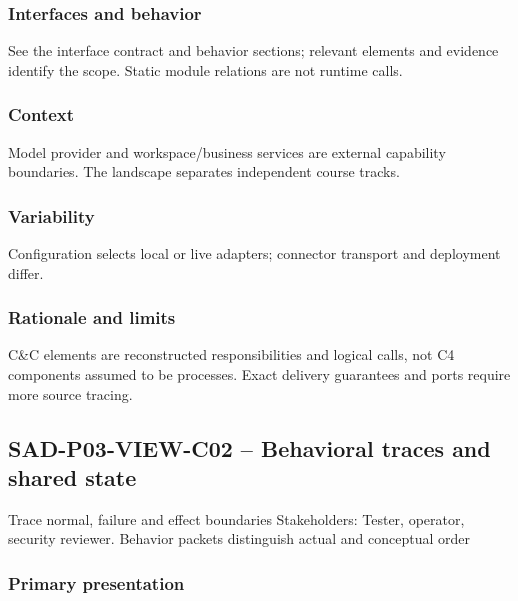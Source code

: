 \documentclass[10pt,letterpaper]{article}
\begin{document}
\subsubsection{Interfaces and behavior}
See the interface contract and behavior sections; relevant elements and evidence identify the scope. Static module relations are not runtime calls.
\subsubsection{Context}
Model provider and workspace/business services are external capability boundaries. The landscape separates independent course tracks.
\subsubsection{Variability}
Configuration selects local or live adapters; connector transport and deployment differ.
\subsubsection{Rationale and limits}
C\&C elements are reconstructed responsibilities and logical calls, not C4 components assumed to be processes. Exact delivery guarantees and ports require more source tracing.
\subsection{SAD-P03-VIEW-C02 -- Behavioral traces and shared state}
Trace normal, failure and effect boundaries Stakeholders: Tester, operator, security reviewer. Behavior packets distinguish actual and conceptual order
\subsubsection{Primary presentation}
\end{document}
